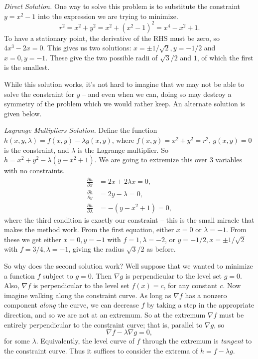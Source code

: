 \emph{Direct Solution.} One way to solve this problem is to substitute the constraint $y = x^2 - 1$ into the expression we are trying to minimize.
$$
r^2 = x^2 + y^2 = x^2 + (x^2 - 1)^2 = x^4 - x^2 + 1.
$$
To have a stationary point, the derivative of the RHS must be zero, so $4x^3 - 2x = 0$. This gives us two solutions: $x = \pm 1/\sqrt{2}, y = - 1/2$ and $x = 0, y = -1$. These give the two possible radii of $\sqrt{3}/2$ and $1$, of which the first is the smallest.

While this solution works, it's not hard to imagine that we may not be able to solve the constraint for $y$ -- and even when we can, doing so may destroy a symmetry of the problem which we would rather keep. An alternate solution is given below.

\emph{Lagrange Multipliers Solution.} Define the function $h(x, y, \lambda) = f(x, y) - \lambda g(x, y)$, where $f(x, y) = x^2 + y^2 = r^2$, $g(x, y) = 0$ is the constraint, and $\lambda$ is the Lagrange multiplier. So $h = x^2 + y^2 - \lambda (y - x^2 + 1)$. We are going to extremize this over $3$ variables with no constraints.
\begin{align*}
	\frac{\partial h}{\partial x} &= 2x + 2 \lambda x = 0, \\
	\frac{\partial h}{\partial y} &= 2y - \lambda  = 0, \\
	\frac{\partial h}{\partial \lambda} &= -(y - x^2 + 1) = 0,
\end{align*}
where the third condition is exactly our constraint -- this is the small miracle that makes the method work. From the first equation, either $x = 0$ or $\lambda = -1$. From these we get either $x = 0, y = -1$ with $f = 1, \lambda = -2$, or $y = -1/2, x = \pm 1/\sqrt{2}$ with $f = 3/4, \lambda = -1$, giving the radius $\sqrt{3}/2$ as before.

So why does the second solution work? Well suppose that we wanted to minimize a function $f$ subject to $g = 0$. Then $\nabla g$ is perpendicular to the level set $g = 0$. Also, $\nabla f$ is perpendicular to the level set $f(x) = c$, for any constant $c$. Now imagine walking along the constraint curve. As long as $\nabla f$ has a nonzero component \emph{along} the curve, we can decrease $f$ by taking a step in the appropriate direction, and so we are not at an extremum. So at the extremum $\nabla f$ must be entirely perpendicular to the constraint curve; that is, parallel to $\nabla g$, so
$$
\nabla f - \lambda \nabla g = 0,
$$
for some $\lambda$. Equivalently, the level curve of $f$ through the extremum is \emph{tangent} to the constraint curve. Thus it suffices to consider the extrema of $h = f - \lambda g$.

